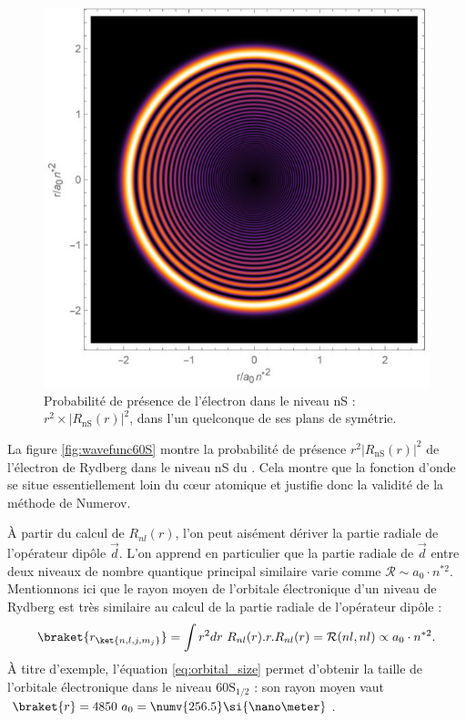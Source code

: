 \begin{figure}[!h]
	\centering
	\includegraphics[width=0.6\linewidth]{figures/theory/WaveFunc_60S_}
	\caption[Fonction d'onde du niveau nS]{Probabilité de présence de l'électron dans le niveau nS : $r^2\times |R_{\mathrm{nS}}(r)|^2$, dans l'un quelconque de ses plans de symétrie.}
	\label{fig:wavefunc60S}
\end{figure}

La figure \eqref{fig:wavefunc60S} montre la probabilité de présence $r^2|R_{\mathrm{nS}}(r)|^2$ de l'électron de Rydberg dans le niveau nS du .
Cela montre que la fonction d'onde se situe essentiellement loin du c\oe ur atomique et justifie donc la validité de la méthode de Numerov.

\`A partir du calcul de $R_{nl}(r)$, l'on peut aisément dériver la partie radiale de l'opérateur dipôle $\vec{d}$.
L'on apprend en particulier que la partie radiale de $\vec{d}$ entre deux niveaux de nombre quantique principal similaire varie comme $\mathcal{R} \sim a_0\cdot n^{*2}$.
Mentionnons ici que le rayon moyen de l'orbitale électronique d'un niveau de Rydberg est très similaire au calcul de la partie radiale de l'opérateur dipôle :
\begin{equation}\label{eq:orbital_size}
\braket{r_{\ket{n,l,j,m_j}}} = \int r^2dr~R_{nl}(r).r.R_{nl}(r) = \mathcal{R}(nl,nl) \propto a_0 \cdot n^{*2}.
\end{equation}
\`A titre d'exemple, l'équation \eqref{eq:orbital_size} permet d'obtenir la taille de l'orbitale électronique dans le niveau $\mathrm{60S_{1/2}}$ : son rayon moyen vaut $\braket{r} = 4850~a_0 = \numv{256.5}\si{\nano\meter}$.

